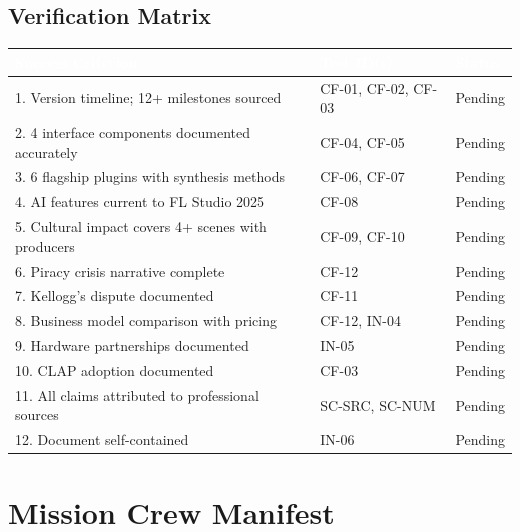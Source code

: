 \documentclass[11pt,letterpaper]{article}
\newcommand{\tableheader}[1]{\textbf{\sffamily\textcolor{white}{#1}}}
\begin{document}
\subsection{Verification Matrix}

\begin{center}
\begin{tabularx}{\textwidth}{XL{3.5cm}C{1.5cm}}
\toprule
{}
\tableheader{Success Criterion} & \tableheader{Test ID(s)} & \tableheader{Status} \\
. Version timeline; 12+ milestones sourced & CF-01, CF-02, CF-03 & Pending \\
2. 4 interface components documented accurately & CF-04, CF-05 & Pending \\
3. 6 flagship plugins with synthesis methods & CF-06, CF-07 & Pending \\
4. AI features current to FL Studio 2025 & CF-08 & Pending \\
5. Cultural impact covers 4+ scenes with producers & CF-09, CF-10 & Pending \\
6. Piracy crisis narrative complete & CF-12 & Pending \\
7. Kellogg's dispute documented & CF-11 & Pending \\
8. Business model comparison with pricing & CF-12, IN-04 & Pending \\
9. Hardware partnerships documented & IN-05 & Pending \\
10. CLAP adoption documented & CF-03 & Pending \\
11. All claims attributed to professional sources & SC-SRC, SC-NUM & Pending \\
12. Document self-contained & IN-06 & Pending \\
\bottomrule
\end{tabularx}
\end{center}

\section{Mission Crew Manifest}
\end{document}
